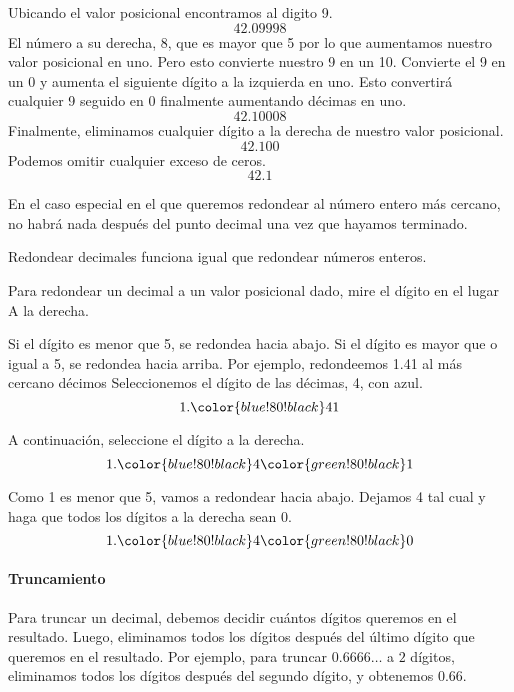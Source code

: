 Ubicando el valor posicional encontramos al digito 9.
\[42.099\boxed{9} \boxed{8}\]
El número a su derecha, 8, que es mayor que 5 por lo que aumentamos nuestro valor posicional en uno. Pero
esto convierte nuestro 9 en un 10. Convierte el 9 en un 0 y aumenta
el siguiente dígito a la izquierda en uno. Esto convertirá cualquier 9 seguido en 0
finalmente aumentando décimas en uno.
\[42. \boxed{100}\boxed{0}\boxed{8}\]
Finalmente, eliminamos cualquier dígito a la derecha de nuestro valor posicional.
\[42.100\]
Podemos omitir cualquier exceso de ceros.
\[42.1\]

En el caso especial en el que queremos redondear al número entero más cercano,
no habrá nada después del punto decimal una vez que hayamos terminado.

Redondear decimales funciona igual que redondear números enteros.

Para redondear un decimal a un valor posicional dado, mire el dígito en el lugar
A la derecha.

Si el dígito es menor que 5, se redondea hacia abajo. Si el dígito es mayor que
o igual a 5, se redondea hacia arriba. Por ejemplo, redondeemos 1.41 al más cercano
décimos Seleccionemos el dígito de las décimas, 4, con azul.
\[1. {\color{blue!80!black} 4 } 1\]

A continuación, seleccione el dígito a la derecha.
\[1. {\color{blue!80!black} 4 } {\color{green!80!black} 1 }\]

Como 1 es menor que 5, vamos a redondear hacia abajo. Dejamos 4 tal cual y
haga que todos los dígitos a la derecha sean 0.
\[1. {\color{blue!80!black} 4 } {\color{green!80!black} 0 }\]

\paragraph{Truncamiento} Para truncar un decimal, debemos decidir cuántos dígitos queremos en el resultado. Luego, eliminamos todos los dígitos después del último dígito que queremos en el resultado.
Por ejemplo, para truncar $0.6666\dots$ a $2$ dígitos, eliminamos todos los dígitos después del segundo dígito, y obtenemos $0.66$.

\newpage